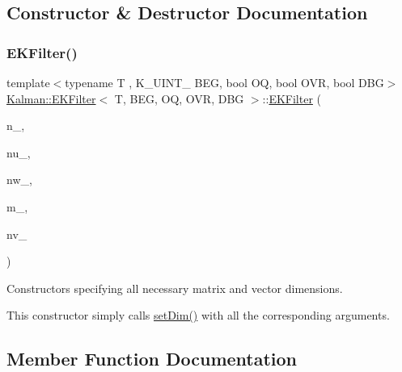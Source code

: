 \subsection{Constructor \& Destructor Documentation}
\mbox{\label{classKalman_1_1EKFilter_aaf0ddc0f02fe2064481400de28a27fde}} 
\subsubsection{\texorpdfstring{E\+K\+Filter()}{EKFilter()}}
{\footnotesize\ttfamily template$<$typename T , K\+\_\+\+U\+I\+N\+T\+\_ B\+EG, bool OQ, bool O\+VR, bool D\+BG$>$ \\
\mbox{\hyperlink{classKalman_1_1EKFilter}{Kalman\+::\+E\+K\+Filter}}$<$ T, B\+EG, OQ, O\+VR, D\+BG $>$\+::\mbox{\hyperlink{classKalman_1_1EKFilter}{E\+K\+Filter}} (\begin{DoxyParamCaption}\item[{\mbox{\hyperlink{namespaceKalman_a628a50cae10f6e2035393d4f96c698bd}{K\+\_\+\+U\+I\+N\+T\+\_\+32}}}]{n\+\_\+,  }\item[{\mbox{\hyperlink{namespaceKalman_a628a50cae10f6e2035393d4f96c698bd}{K\+\_\+\+U\+I\+N\+T\+\_\+32}}}]{nu\+\_\+,  }\item[{\mbox{\hyperlink{namespaceKalman_a628a50cae10f6e2035393d4f96c698bd}{K\+\_\+\+U\+I\+N\+T\+\_\+32}}}]{nw\+\_\+,  }\item[{\mbox{\hyperlink{namespaceKalman_a628a50cae10f6e2035393d4f96c698bd}{K\+\_\+\+U\+I\+N\+T\+\_\+32}}}]{m\+\_\+,  }\item[{\mbox{\hyperlink{namespaceKalman_a628a50cae10f6e2035393d4f96c698bd}{K\+\_\+\+U\+I\+N\+T\+\_\+32}}}]{nv\+\_\+ }\end{DoxyParamCaption})}



Constructors specifying all necessary matrix and vector dimensions. 

This constructor simply calls {\ttfamily \mbox{\hyperlink{classKalman_1_1EKFilter_a0c311fd7fc6d57c206029ea0e902cf2e}{set\+Dim()}}} with all the corresponding arguments. 

\subsection{Member Function Documentation}
\mbox{\label{classKalman_1_1EKFilter_af73c892e9624013167ddecc04be01044}} 
